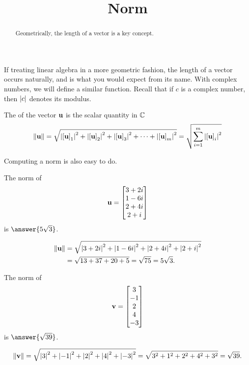 \documentclass{ximera}
\title{Norm}
\begin{document}
\begin{abstract}
  Geometrically, the length of a vector is a key concept.
\end{abstract}
\maketitle

If treating linear algebra in a more geometric fashion, the length of
a vector occurs naturally, and is what you would expect from its name.
With complex numbers, we will define a similar function.  Recall that
if $c$ is a complex number, then $\left\lvert c\right\rvert$ denotes its modulus.

\begin{definition}
  The  of the vector $\mathbf{u}$ is the scalar quantity in $\mathbb{C}$
  \[
    \left\lVert\mathbf{u}\right\rVert=
    \sqrt{
      \left\lvert\left\lbrack\mathbf{u}\right\rbrack_{1}\right\rvert^2+
      \left\lvert\left\lbrack\mathbf{u}\right\rbrack_{2}\right\rvert^2+
      \left\lvert\left\lbrack\mathbf{u}\right\rbrack_{3}\right\rvert^2+
      \cdots+
      \left\lvert\left\lbrack\mathbf{u}\right\rbrack_{m}\right\rvert^2
    }
    =
    \sqrt{\sum_{i=1}^{m}\left\lvert\left\lbrack\mathbf{u}\right\rbrack_{i}\right\rvert^2}
  \]
\end{definition}

Computing a norm is also easy to do.

\begin{example}
The norm of
\[
\mathbf{u}=\begin{bmatrix}3+2i\\1-6i\\2+4i\\2+i\end{bmatrix}
\]
is $\answer{5\sqrt{3}}$.
\begin{hint}
  \begin{align*}
    \left\lVert\mathbf{u}\right\rVert&=
                     \sqrt{\left\lvert3+2i\right\rvert^2+\left\lvert1-6i\right\rvert^2+\left\lvert2+4i\right\rvert^2+\left\lvert2+i\right\rvert^2}\\
                   &=\sqrt{13+37+20+5}=\sqrt{75}=5\sqrt{3}.
  \end{align*}
\end{hint}
\end{example}

\begin{example}
  The norm of
  \[
    \mathbf{v}=\begin{bmatrix}3\\-1\\2\\4\\-3\end{bmatrix}
  \]
  is $\answer{\sqrt{39}}$.
  \begin{hint}
    \[
      \left\lVert\mathbf{v}\right\rVert=
      \sqrt{\left\lvert3\right\rvert^2+\left\lvert-1\right\rvert^2+\left\lvert2\right\rvert^2+\left\lvert4\right\rvert^2+\left\lvert-3\right\rvert^2}
      =\sqrt{3^2+1^2+2^2+4^2+3^2}=\sqrt{39}.
    \]
  \end{hint}
\end{example}
\end{document}
